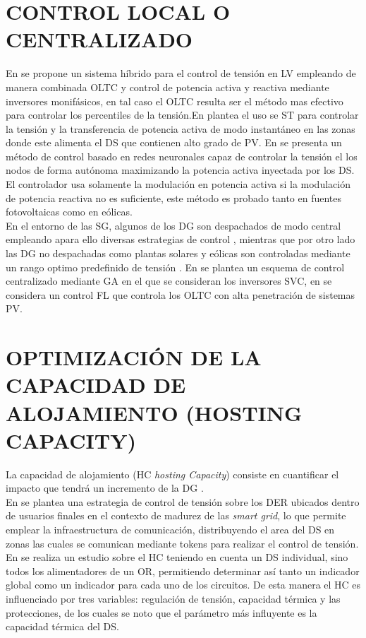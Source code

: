 \documentclass[12pt, letterpaper]{report}
\begin{document}
\section{CONTROL LOCAL O CENTRALIZADO}
En \cite{Efkarpidis2016} se propone un sistema híbrido para el control de tensión en LV empleando de manera combinada \ac{OLTC} y control de potencia activa y reactiva mediante inversores monifásicos, en tal caso el \ac{OLTC} resulta ser el método mas efectivo para controlar los percentiles de la tensión.En \cite{Colak2015} plantea el uso se \ac{ST} para controlar la tensión y la transferencia de potencia activa de modo instantáneo en las zonas donde este alimenta el \ac{DS}  que contienen alto grado de \ac{PV}. En \cite{Calderaro2014} se presenta un método de control basado en redes neuronales  capaz de controlar la tensión el los nodos de forma autónoma maximizando la potencia activa inyectada por los \ac{DS}. El controlador usa solamente la modulación en potencia activa si la modulación  de potencia reactiva no es suficiente, este método es probado tanto en fuentes fotovoltaicas  como en eólicas.\\  

En el entorno de las \ac{SG}, algunos de los  \ac{DG} son despachados de modo central empleando apara ello diversas estrategias de control , mientras que por otro lado las \ac{DG} no despachadas como plantas solares y eólicas son controladas mediante un rango optimo predefinido de tensión \cite{Vandoorn2013} \cite{colak2015survey}.
En \cite{Oshiro2011a} se plantea un esquema de control centralizado mediante \ac{GA}  en el que se consideran los inversores SVC,  en \cite{Shalwala2011a} se considera un control \ac{FL} que controla los \ac{OLTC}  con alta penetración de sistemas \ac{PV}.

\section{OPTIMIZACIÓN DE LA CAPACIDAD DE ALOJAMIENTO (HOSTING CAPACITY)}	
La capacidad de alojamiento (HC \textit{hosting Capacity}) consiste en cuantificar el impacto que tendrá un incremento de la DG \cite{Bollen2008}.\\
En \cite{Caldon2015a} se plantea una estrategia de control de tensión sobre los DER ubicados dentro  de usuarios finales en el contexto de madurez de las \textit{smart grid}, lo que permite emplear la infraestructura de comunicación, distribuyendo el area del \ac{DS} en zonas las cuales se comunican mediante tokens para realizar el control de tensión.\\
En \cite{Rylander2016a} se realiza un estudio sobre el HC teniendo en cuenta un \ac{DS} individual,  sino todos los alimentadores de un OR, permitiendo determinar  así tanto un indicador global como un indicador para cada uno de los circuitos.  De esta manera el HC es influenciado por tres variables: regulación de tensión, capacidad térmica  y las protecciones, de los cuales se noto que el parámetro más influyente es la capacidad térmica del \ac{DS}.
\end{document}
